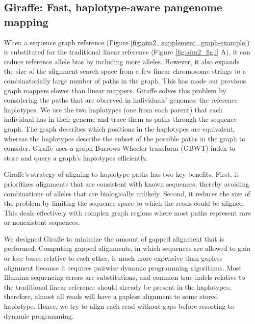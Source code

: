 \documentclass[11pt]{ucscthesis}
\begin{document}
\subsection{Giraffe: Fast, haplotype-aware pangenome mapping}
When a sequence graph reference\cite{noauthor_computational_2016} (Figure \ref{fig:aim2_supplement_graph-example}) is substituted for the traditional linear reference (Figure \ref{fig:aim2_fig1} A), it can reduce reference allele bias by including more alleles\cite{garrison_variation_2018}. 
However, it also expands the size of the alignment search space from a few linear chromosome strings to a combinatorially large number of paths in the graph.
This has made our previous graph mappers slower than linear mappers\cite{garrison_variation_2018}.
Giraffe solves this problem by considering the paths that are observed in individuals’ genomes: the reference haplotypes.
We use the two haplotypes (one from each parent) that each individual has in their genome and trace them as paths through the sequence graph.
The graph describes which positions in the haplotypes are equivalent, whereas the haplotypes describe the subset of the possible paths in the graph to consider.
Giraffe uses a graph Burrows-Wheeler transform (GBWT) index\cite{siren_indexes_2020} to store and query a graph’s haplotypes efficiently.

Giraffe’s strategy of aligning to haplotype paths has two key benefits.
First, it prioritizes alignments that are consistent with known sequences, thereby avoiding combinations of alleles that are biologically unlikely.
Second, it reduces the size of the problem by limiting the sequence space to which the reads could be aligned.
This deals effectively with complex graph regions where most paths represent rare or nonexistent sequences.

We designed Giraffe to minimize the amount of gapped alignment that is performed.
Computing gapped alignments, in which sequences are allowed to gain or lose bases relative to each other, is much more expensive than gapless alignment because it requires pairwise dynamic programming algorithms.
Most Illumina sequencing errors are substitutions\cite{schirmer2016illumina}, and common true indels relative to the traditional linear reference should already be present in the haplotypes; therefore, almost all reads will have a gapless alignment to some stored haplotype.
Hence, we try to align each read without gaps before resorting to dynamic programming.
\end{document}
